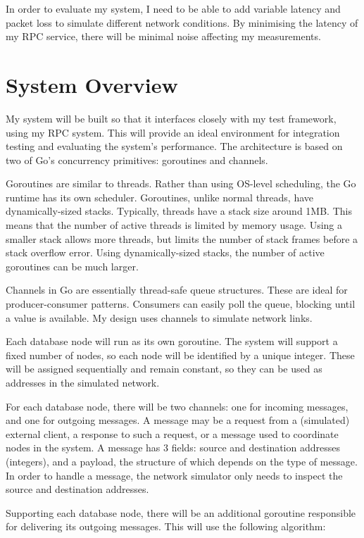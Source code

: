 \documentclass[12pt,a4paper]{article}
\begin{document}
In order to evaluate my system, I need to be able to add variable latency and packet loss to simulate different network conditions. By minimising the latency of my RPC service, there will be minimal noise affecting my measurements.

\section*{System Overview}

My system will be built so that it interfaces closely with my test framework, using my RPC system. This will provide an ideal environment for integration testing and evaluating the system's performance. The architecture is based on two of Go's concurrency primitives: goroutines and channels.

Goroutines are similar to threads. Rather than using OS-level scheduling, the Go runtime has its own scheduler. Goroutines, unlike normal threads, have dynamically-sized stacks. Typically, threads have a stack size around 1MB. This means that the number of active threads is limited by memory usage. Using a smaller stack allows more threads, but limits the number of stack frames before a stack overflow error. Using dynamically-sized stacks, the number of active goroutines can be much larger.

Channels in Go are essentially thread-safe queue structures. These are ideal for producer-consumer patterns. Consumers can easily poll the queue, blocking until a value is available. My design uses channels to simulate network links.

Each database node will run as its own goroutine. The system will support a fixed number of nodes, so each node will be identified by a unique integer. These will be assigned sequentially and remain constant, so they can be used as addresses in the simulated network.

For each database node, there will be two channels: one for incoming messages, and one for outgoing messages. A message may be a request from a (simulated) external client, a response to such a request, or a message used to coordinate nodes in the system. A message has 3 fields: source and destination addresses (integers), and a payload, the structure of which depends on the type of message. In order to handle a message, the network simulator only needs to inspect the source and destination addresses.

Supporting each database node, there will be an additional goroutine responsible for delivering its outgoing messages. This will use the following algorithm:
\end{document}
